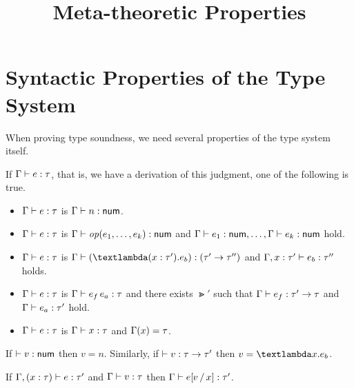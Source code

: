 \documentclass{article}
\title{Meta-theoretic Properties}
\author{}
\date{}
\begin{document}
\maketitle

\section{Syntactic Properties of the Type System}

When proving type soundness, we need several properties of the type system itself.

\begin{prop}
  If $\TTypes{\GG}{e}{\Gt}$, that is, we have a derivation of this judgment, one of the following is true.
  \begin{itemize}
    \item $\TTypes{\GG}{e}{\Gt}$ is $\TTypes{\GG}{n}{\TNum}$.
    \item $\TTypes{\GG}{e}{\Gt}$ is $\TTypes{\GG}{\TOp{e_1,\dots,e_k}}{\TNum}$ and $\TTypes{\GG}{e_1}{\TNum},\dots,\TTypes{\GG}{e_k}{\TNum}$ hold.
    \item $\TTypes{\GG}{e}{\Gt}$ is $\TTypes{\GG}{(\TFun{(\TAnn{x}{\Gt'})}{e_b})}{(\TArrow{\Gt'}{\Gt''})}$ and $\TTypes{\GG,\TAnn{x}{\Gt'}}{e_b}{\Gt''}$ holds.
    \item $\TTypes{\GG}{e}{\Gt}$ is $\TTypes{\GG}{\TApp{e_f}{e_a}}{\Gt}$ and there exists $\Gt'$ such that $\TTypes{\GG}{e_f}{\TArrow{\Gt'}{\Gt}}$ and $\TTypes{\GG}{e_a}{\Gt'}$ hold.
    \item $\TTypes{\GG}{e}{\Gt}$ is $\TTypes{\GG}{x}{\Gt}$ and $\GG(x)=\Gt$.
  \end{itemize}
\end{prop}

\begin{prop}
  If $\TTypes{}{v}{\TNum}$ then $v=n$. Similarly, if $\TTypes{}{v}{\TArrow{\Gt}{\Gt'}}$ then $v=\TFun{x}{e_b}$.
\end{prop}

\begin{prop} If $\TTypes{\GG,(\TAnn{x}{\Gt})}{e}{\Gt'}$
and $\TTypes{\GG}{v}{\Gt}$ then $\TTypes{\GG}{\subst{e}{x}{v}}{\Gt'}$.
\end{prop}
\end{document}
